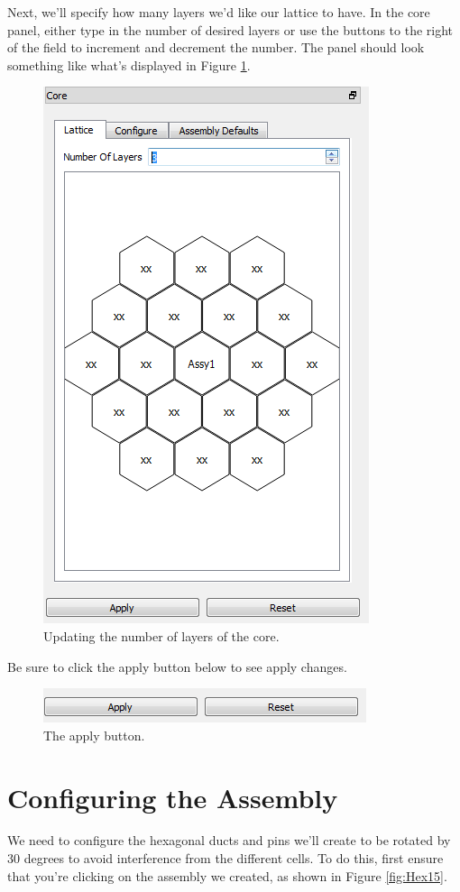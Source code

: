 Next, we'll specify how many layers we'd like our lattice to have.  In the core panel, either type in the number of desired layers or use the buttons to the right of the field to increment and decrement the number.  The panel should look something like what's displayed in Figure \ref{fig:Hex3}.

\begin{figure}[H]
	\begin{center}
		\includegraphics[width=0.5\linewidth]{Images/hex-3.png}
		\caption{Updating the number of layers of the core.}
		\label{fig:Hex3}
	\end{center}
\end{figure}

Be sure to click the apply button below to see apply changes.

\begin{figure}[H]
	\begin{center}
		\includegraphics[width=0.5\linewidth]{Images/hex-4.png}
		\caption{The apply button.}
		\label{fig:Hex4}
	\end{center}
\end{figure}

\section{Configuring the Assembly}
\label{section:RotateAssembly30}
We need to configure the hexagonal ducts and pins we'll create to be rotated by 30 degrees to avoid interference from the different cells.  To do this, first ensure that you're clicking on the assembly we created, as shown in Figure \ref{fig:Hex15}.

